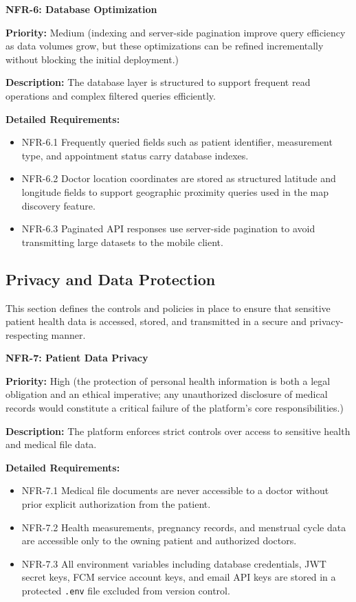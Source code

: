 \medskip

\textbf{NFR-6: Database Optimization}

\textbf{Priority:} Medium (indexing and server-side pagination improve query efficiency as data volumes grow, but these optimizations can be refined incrementally without blocking the initial deployment.)

\textbf{Description:} The database layer is structured to support frequent read
operations and complex filtered queries efficiently.

\textbf{Detailed Requirements:}
\begin{itemize}
    \item NFR-6.1 \; Frequently queried fields such as patient identifier, measurement
    type, and appointment status carry database indexes.
    \item NFR-6.2 \; Doctor location coordinates are stored as structured latitude and
    longitude fields to support geographic proximity queries used in the map discovery
    feature.
    \item NFR-6.3 \; Paginated API responses use server-side pagination to avoid
    transmitting large datasets to the mobile client.
\end{itemize}

\subsection{Privacy and Data Protection}

This section defines the controls and policies in place to ensure that sensitive patient
health data is accessed, stored, and transmitted in a secure and privacy-respecting manner.

\textbf{NFR-7: Patient Data Privacy}

\textbf{Priority:} High (the protection of personal health information is both a legal obligation and an ethical imperative; any unauthorized disclosure of medical records would constitute a critical failure of the platform's core responsibilities.)

\textbf{Description:} The platform enforces strict controls over access to sensitive
health and medical file data.

\textbf{Detailed Requirements:}
\begin{itemize}
    \item NFR-7.1 \; Medical file documents are never accessible to a doctor without
    prior explicit authorization from the patient.
    \item NFR-7.2 \; Health measurements, pregnancy records, and menstrual cycle data
    are accessible only to the owning patient and authorized doctors.
    \item NFR-7.3 \; All environment variables including database credentials, JWT secret
    keys, FCM service account keys, and email API keys are stored in a protected
    \texttt{.env} file excluded from version control.
\end{itemize}

